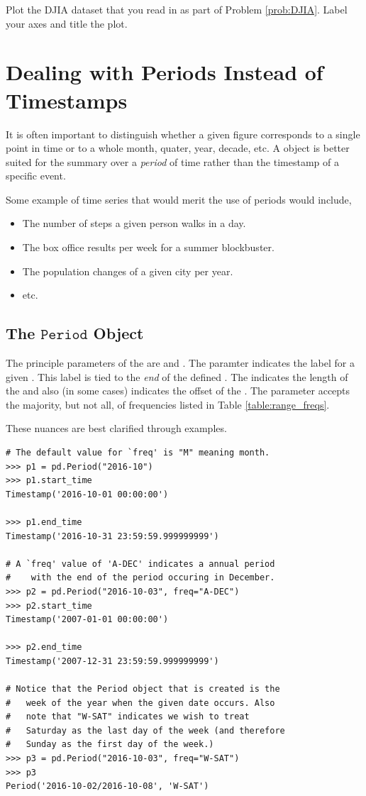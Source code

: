 \begin{problem} \label{prob:plot}
Plot the DJIA dataset that you read in as part of Problem \ref{prob:DJIA}. Label your axes and title the plot.
\end{problem}

\section*{Dealing with Periods Instead of Timestamps}
It is often important to distinguish whether a given figure corresponds to a single point in time or to a whole month, quater, year, decade, etc. A  object is better suited for the summary over a \emph{period} of time rather than the timestamp of a specific event.

Some example of time series that would merit the use of periods would include,
\begin{itemize}
    \item The number of steps a given person walks in a day.
    \item The box office results per week for a summer blockbuster.
    \item The population changes of a given city per year.
    \item etc.
\end{itemize}

\subsection*{The $\texttt{Period}$ Object}
The principle parameters of the  are  and . The  paramter indicates the label for a given . This label is tied to the \emph{end} of the defined . The  indicates the length of the  and also (in some cases) indicates the offset of the . The  parameter accepts the majority, but not all, of frequencies listed in Table \ref{table:range_freqs}.

These nuances are best clarified through examples.

\begin{lstlisting}
# The default value for `freq' is "M" meaning month.
>>> p1 = pd.Period("2016-10")
>>> p1.start_time
Timestamp('2016-10-01 00:00:00')

>>> p1.end_time
Timestamp('2016-10-31 23:59:59.999999999')

# A `freq' value of 'A-DEC' indicates a annual period
#    with the end of the period occuring in December.
>>> p2 = pd.Period("2016-10-03", freq="A-DEC")
>>> p2.start_time
Timestamp('2007-01-01 00:00:00')

>>> p2.end_time
Timestamp('2007-12-31 23:59:59.999999999')

# Notice that the Period object that is created is the
#   week of the year when the given date occurs. Also
#   note that "W-SAT" indicates we wish to treat
#   Saturday as the last day of the week (and therefore
#   Sunday as the first day of the week.)
>>> p3 = pd.Period("2016-10-03", freq="W-SAT")
>>> p3
Period('2016-10-02/2016-10-08', 'W-SAT')
\end{lstlisting}

